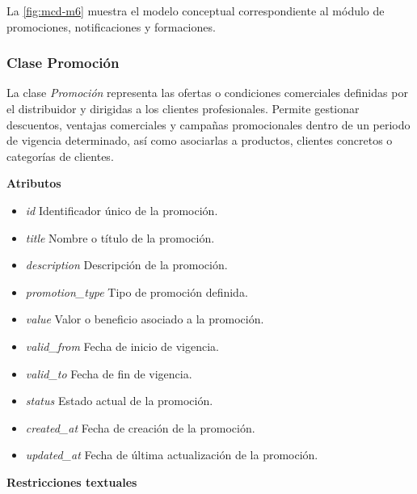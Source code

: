 La \autoref{fig:mcd-m6} muestra el modelo conceptual correspondiente al módulo de promociones, notificaciones y formaciones.


\subsubsection{Clase Promoción}

La clase \textit{Promoción} representa las ofertas o condiciones comerciales definidas por el distribuidor y dirigidas a los clientes profesionales. Permite gestionar descuentos, ventajas comerciales y campañas promocionales dentro de un periodo de vigencia determinado, así como asociarlas a productos, clientes concretos o categorías de clientes.

\textbf{Atributos}

\begin{itemize}

      \item \textit{id}
            Identificador único de la promoción.
      \item \textit{title}
            Nombre o título de la promoción.
      \item \textit{description}
            Descripción de la promoción.
      \item \textit{promotion\_type}
            Tipo de promoción definida.
      \item \textit{value}
            Valor o beneficio asociado a la promoción.
      \item \textit{valid\_from}
            Fecha de inicio de vigencia.
      \item \textit{valid\_to}
            Fecha de fin de vigencia.
      \item \textit{status}
            Estado actual de la promoción.
      \item \textit{created\_at}
            Fecha de creación de la promoción.
      \item \textit{updated\_at}
            Fecha de última actualización de la promoción.

\end{itemize}

\textbf{Restricciones textuales}

